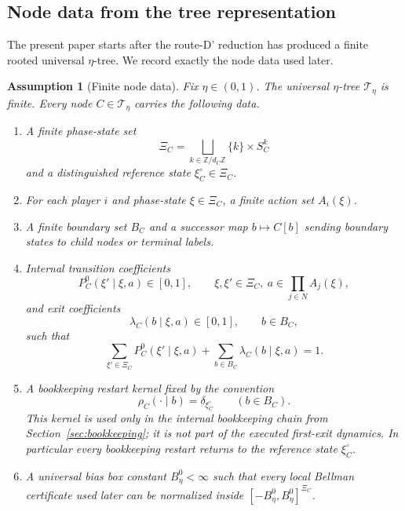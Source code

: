 \documentclass[12pt]{article}
\newtheorem{assumption}[theorem]{Assumption}
\theoremstyle{definition}
\newcommand{\1}{\mathbf{1}}
\newcommand{\cT}{\mathcal{T}}
\begin{document}
\subsection{Node data from the tree representation}

The present paper starts after the route-D' reduction has produced a finite rooted
universal $\eta$-tree. We record exactly the node data used later.

\begin{assumption}[Finite node data]
\label{ass:node-data}
Fix $\eta\in(0,1)$. The universal $\eta$-tree $\cT_\eta$ is finite. Every node
$C\in \cT_\eta$ carries the following data.
\begin{enumerate}[label=\textnormal{(D\arabic*)},leftmargin=2.8em]
\item A finite phase-state set
\[
\Xi_C=\bigsqcup_{k\in\mathbb Z/d_C\mathbb Z}\{k\}\times S_C^k
\]
and a distinguished reference state $\xi_C^\circ\in\Xi_C$.
\item For each player $i$ and phase-state $\xi\in\Xi_C$, a finite action set
$A_i(\xi)$.
\item A finite boundary set $B_C$ and a successor map $b\mapsto C[b]$ sending
boundary states to child nodes or terminal labels.
\item Internal transition coefficients
\[
P_C^0(\xi'\mid \xi,a)\in[0,1],
\qquad \xi,\xi'\in \Xi_C,
\ a\in \prod_{j\in N}A_j(\xi),
\]
and exit coefficients
\[
\lambda_C(b\mid \xi,a)\in[0,1],
\qquad b\in B_C,
\]
such that
\[
\sum_{\xi'\in\Xi_C}P_C^0(\xi'\mid \xi,a)+\sum_{b\in B_C}\lambda_C(b\mid\xi,a)=1.
\]
\item A bookkeeping restart kernel fixed by the convention
\[
\rho_C(\cdot\mid b)=\delta_{\xi_C^\circ}
\qquad (b\in B_C).
\]
This kernel is used only in the internal bookkeeping chain from
Section~\ref{sec:bookkeeping}; it is not part of the executed first-exit
dynamics. In particular every bookkeeping restart returns to the reference
state $\xi_C^\circ$.
\item A universal bias box constant $B_\eta^0<\infty$ such that every local
Bellman certificate used later can be normalized inside
$[-B_\eta^0,B_\eta^0]^{\Xi_C}$.
\end{enumerate}
\end{assumption}
\end{document}
